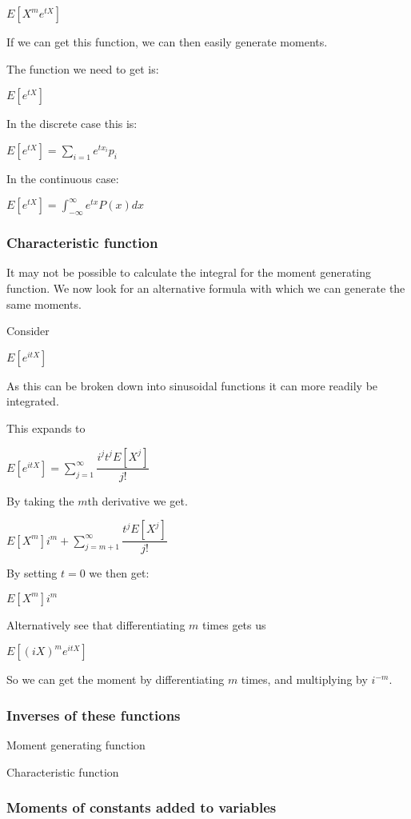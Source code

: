 \(E[X^me^{tX}]\)

If we can get this function, we can then easily generate moments.

The function we need to get is:

\(E[e^{tX}]\)

In the discrete case this is:

\(E[e^{tX}]=\sum_{i=1}e^{tx_i}p_i\)

In the continuous case:

\(E[e^{tX}]=\int_{-\infty }^\infty e^{tx}P(x) dx\)

\subsubsection{Characteristic function}

It may not be possible to calculate the integral for the moment generating function. We now look for an alternative formula with which we can generate the same moments.

Consider

\(E[e^{itX}]\)

As this can be broken down into sinusoidal functions it can more readily be integrated.

This expands to

\(E[e^{itX}]=\sum_{j=1}^\infty \dfrac{i^jt^jE[X^j]}{j!}\)

By taking the \(m\)th derivative we get.

\(E[X^m]i^m+\sum_{j=m+1}^\infty \dfrac{t^jE[X^j]}{j!}\)

By setting \(t=0\) we then get:

\(E[X^m]i^m\)

Alternatively see that differentiating \(m\) times gets us

\(E[(iX)^me^{itX}]\)

So we can get the moment by differentiating \(m\) times, and multiplying by \(i^{-m}\).

\subsubsection{Inverses of these functions}

Moment generating function

Characteristic function

\subsubsection{Moments of constants added to variables}

